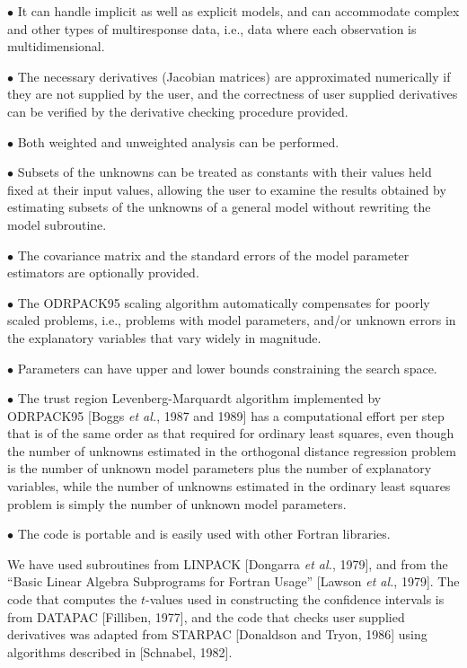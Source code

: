 \item{$\bullet$} It can handle implicit as well as explicit models, and can accommodate complex and other types of multiresponse data, i.e., data where each observation is multidimensional.

\item{$\bullet$} The necessary derivatives (Jacobian matrices) are approximated numerically if they are not supplied by the user, and the correctness of user supplied derivatives can be verified by the derivative checking procedure provided.

\item{$\bullet$} Both weighted and unweighted analysis can be performed.

\item{$\bullet$} Subsets of the unknowns can be treated as constants with their values held fixed at their input values, allowing the user to examine the results obtained by estimating subsets of the unknowns of a general model without rewriting the model subroutine.

\item{$\bullet$} The covariance matrix and the standard errors of the model parameter estimators are optionally provided.

\item{$\bullet$} The ODRPACK95 scaling algorithm automatically compensates
for poorly scaled problems, i.e., problems with model parameters, and/or
unknown errors in the explanatory variables that vary widely in magnitude.

\item{$\bullet$} Parameters can have upper and lower bounds constraining the
search space.

\item{$\bullet$} The trust region Levenberg-Marquardt algorithm implemented by
ODRPACK95 [Boggs {\it et al.}, 1987 and 1989] has a computational effort per step that is of the same order as that required for ordinary least squares, even though the number of unknowns estimated in the orthogonal distance regression problem is the number of unknown model parameters plus the number of explanatory variables, while the number of unknowns estimated in the ordinary least squares problem is simply the number of unknown model parameters.

\item{$\bullet$} The code is portable and is easily used with other
Fortran libraries.

\noindent We have used subroutines from LINPACK [Dongarra {\it et al.},
1979], and from the ``Basic Linear Algebra Subprograms for Fortran Usage''
[Lawson {\it et al.}, 1979]. The code that computes the $t$-values used
in constructing the confidence intervals is from DATAPAC [Filliben,
1977], and the code that checks user supplied derivatives was adapted
from STARPAC [Donaldson and Tryon, 1986] using algorithms described in
[Schnabel, 1982].

